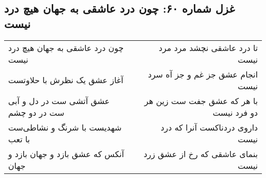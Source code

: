 \begin{center}
\section*{غزل شماره ۶۰: چون درد عاشقی به جهان هیچ درد نیست}
\label{sec:060}
\begin{longtable}{l p{0.5cm} r}
چون درد عاشقی به جهان هیچ درد نیست
&&
تا درد عاشقی نچشد مرد مرد نیست
\\
آغاز عشق یک نظرش با حلاوتست
&&
انجام عشق جز غم و جز آه سرد نیست
\\
عشق آتشی ست در دل و آبی ست در دو چشم
&&
با هر که عشق جفت ست زین هر دو فرد نیست
\\
شهدیست با شرنگ و نشاطی‌ست با تعب
&&
داروی دردناکست آنرا که درد نیست
\\
آنکس که عشق بازد و جهان بازد و جهان
&&
بنمای عاشقی که رخ از عشق زرد نیست
\\
\end{longtable}
\end{center}
